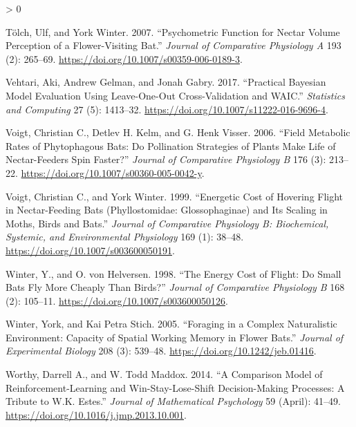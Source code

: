\documentclass[
]{article}
\newlength{\cslhangindent}
\newenvironment{CSLReferences}[2] %
 {%
  \setlength{\parindent}{0pt}
  \ifodd #1 \everypar{\setlength{\hangindent}{\cslhangindent}}\ignorespaces\fi
  \ifnum #2 > 0
  \setlength{\parskip}{#2\baselineskip}
  \fi
 }%
 {}
\begin{document}
\begin{CSLReferences}{1}{0}
\leavevmode\hypertarget{ref-tolch_psychometric_2007}{}%
Tölch, Ulf, and York Winter. 2007. {``Psychometric Function for Nectar Volume Perception of a Flower-Visiting Bat.''} \emph{Journal of Comparative Physiology A} 193 (2): 265--69. \url{https://doi.org/10.1007/s00359-006-0189-3}.

\leavevmode\hypertarget{ref-vehtari_practical_2017}{}%
Vehtari, Aki, Andrew Gelman, and Jonah Gabry. 2017. {``Practical {Bayesian} Model Evaluation Using Leave-One-Out Cross-Validation and {WAIC}.''} \emph{Statistics and Computing} 27 (5): 1413--32. \url{https://doi.org/10.1007/s11222-016-9696-4}.

\leavevmode\hypertarget{ref-voigt_field_2006}{}%
Voigt, Christian C., Detlev H. Kelm, and G. Henk Visser. 2006. {``Field Metabolic Rates of Phytophagous Bats: Do Pollination Strategies of Plants Make Life of Nectar-Feeders Spin Faster?''} \emph{Journal of Comparative Physiology B} 176 (3): 213--22. \url{https://doi.org/10.1007/s00360-005-0042-y}.

\leavevmode\hypertarget{ref-voigt_energetic_1999}{}%
Voigt, Christian C., and York Winter. 1999. {``Energetic Cost of Hovering Flight in Nectar-Feeding Bats ({Phyllostomidae}: {Glossophaginae}) and Its Scaling in Moths, Birds and Bats.''} \emph{Journal of Comparative Physiology B: Biochemical, Systemic, and Environmental Physiology} 169 (1): 38--48. \url{https://doi.org/10.1007/s003600050191}.

\leavevmode\hypertarget{ref-winter_energy_1998}{}%
Winter, Y., and O. von Helversen. 1998. {``The Energy Cost of Flight: Do Small Bats Fly More Cheaply Than Birds?''} \emph{Journal of Comparative Physiology B} 168 (2): 105--11. \url{https://doi.org/10.1007/s003600050126}.

\leavevmode\hypertarget{ref-winter_foraging_2005}{}%
Winter, York, and Kai Petra Stich. 2005. {``Foraging in a Complex Naturalistic Environment: Capacity of Spatial Working Memory in Flower Bats.''} \emph{Journal of Experimental Biology} 208 (3): 539--48. \url{https://doi.org/10.1242/jeb.01416}.

\leavevmode\hypertarget{ref-worthy_comparison_2014}{}%
Worthy, Darrell A., and W. Todd Maddox. 2014. {``A {Comparison} {Model} of {Reinforcement}-{Learning} and {Win}-{Stay}-{Lose}-{Shift} {Decision}-{Making} {Processes}: {A} {Tribute} to {W}.{K}. {Estes}.''} \emph{Journal of Mathematical Psychology} 59 (April): 41--49. \url{https://doi.org/10.1016/j.jmp.2013.10.001}.

\end{CSLReferences}
\end{document}
